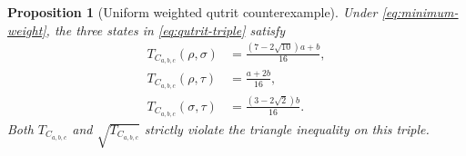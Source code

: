 \documentclass[11pt]{article}
\newtheorem{proposition}[theorem]{Proposition}
\begin{document}
\begin{proposition}[Uniform weighted qutrit counterexample]
\label{prop:weighted-qutrit-counterexample}
    Under \eqref{eq:minimum-weight}, the three states in
    \eqref{eq:qutrit-triple} satisfy
    \begin{align}
        T_{C_{a,b,c}}(\rho,\sigma)
        &=\frac{(7-2\sqrt{10})a+b}{16},
        \label{eq:cost-rho-sigma}\\
        T_{C_{a,b,c}}(\rho,\tau)
        &=\frac{a+2b}{16},
        \label{eq:cost-rho-tau}\\
        T_{C_{a,b,c}}(\sigma,\tau)
        &=\frac{(3-2\sqrt2)b}{16}.
        \label{eq:cost-sigma-tau}
    \end{align}
    Both $T_{C_{a,b,c}}$ and $\sqrt{T_{C_{a,b,c}}}$ strictly violate the
    triangle inequality on this triple.
\end{proposition}
\end{document}
